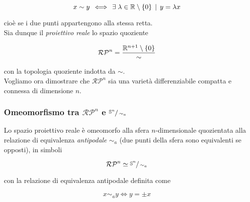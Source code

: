 \begin{equation}
	x \sim y \, \iff \, \exists \; \lambda \in \mathbb{R} \setminus \{0\} \, \mid \, y = \lambda x
\end{equation}

cioè se i due punti appartengono alla stessa retta.\\
Sia dunque il \textit{proiettivo reale} lo spazio quoziente

\begin{equation}
	\mathcal{RP}^{n} = \dfrac{\mathbb{R}^{n+1} \setminus \{0\}}{\sim}
\end{equation}

con la topologia quoziente indotta da $ \sim $.\\
Vogliamo ora dimostrare che $ \mathcal{RP}^{n} $ sia una varietà differenziabile compatta e connessa di dimensione $ n $.

\subsubsection{Omeomorfismo tra $ \mathcal{RP}^{n} $ e $ \sfrac{\mathbb{S}^{n}}{\sim_{a}} $}

\begin{definition}
	Lo spazio proiettivo reale è omeomorfo alla sfera $ n $-dimensionale quozientata alla relazione di equivalenza \textit{antipodale} $ \sim_{a} $ (due punti della sfera sono equivalenti se opposti), in simboli
	
	\begin{equation}
		\mathcal{RP}^{n} \simeq \sfrac{\mathbb{S}^{n}}{\sim_{a}}
	\end{equation}

	con la relazione di equivalenza antipodale definita come
	
	\begin{equation}
		x \sim_{a} y \iff y = \pm x
	\end{equation}
\end{definition}


